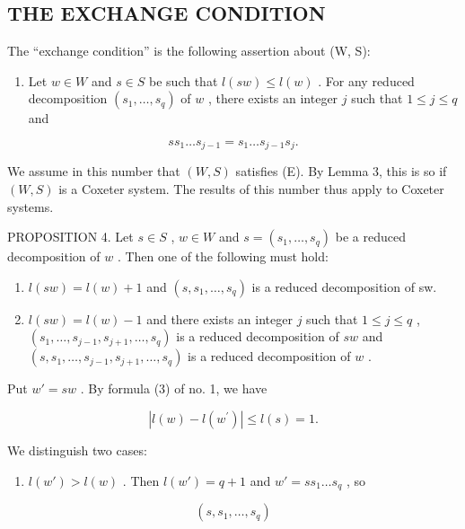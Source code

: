 \subsection{THE EXCHANGE CONDITION}

The ``exchange condition'' is the following assertion about (W, S):

\begin{enumerate}
\def\labelenumi{(\Alph{enumi})}
\setcounter{enumi}{4}
\tightlist
\item
  Let \(w \in W\) and \(s \in S\) be such that \(l(sw) \leqslant l(w)\) . For any reduced decomposition \((s_1, \ldots, s_q)\) of \(w\) , there exists an integer \(j\) such that \(1 \leqslant j \leqslant q\) and
\end{enumerate}

\[
s s _ {1} \dots s _ {j - 1} = s _ {1} \dots s _ {j - 1} s _ {j}.\tag{16}
\]

We assume in this number that \((W,S)\) satisfies (E). By Lemma 3, this is so if \((W,S)\) is a Coxeter system. The results of this number thus apply to Coxeter systems.

PROPOSITION 4. Let \(s \in S\) , \(w \in W\) and \(s = (s_1, \ldots, s_q)\) be a reduced decomposition of \(w\) . Then one of the following must hold:

\begin{enumerate}
\def\labelenumi{\alph{enumi})}
\item
  \(l(sw) = l(w) + 1\) and \((s, s_1, \ldots, s_q)\) is a reduced decomposition of sw.
\item
  \(l(sw) = l(w) - 1\) and there exists an integer \(j\) such that \(1 \leqslant j \leqslant q\) , \((s_1, \ldots, s_{j-1}, s_{j+1}, \ldots, s_q)\) is a reduced decomposition of \(sw\) and \((s, s_1, \ldots, s_{j-1}, s_{j+1}, \ldots, s_q)\) is a reduced decomposition of \(w\) .
\end{enumerate}

Put \(w' = sw\) . By formula (3) of no. 1, we have

\[
\left| l (w) - l \left(w ^ {\prime}\right) \right| \leqslant l (s) = 1.
\]

We distinguish two cases:

\begin{enumerate}
\def\labelenumi{\alph{enumi})}
\tightlist
\item
  \(l(w') > l(w)\) . Then \(l(w') = q + 1\) and \(w' = ss_1 \ldots s_q\) , so
\end{enumerate}

\[
\left(s, s _ {1}, \ldots , s _ {q}\right)
\]

